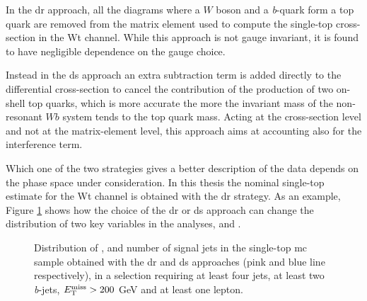 In the \gls{dr} approach, all the diagrams where a $W$ boson and a \textit{b}-quark form a top quark are removed from the matrix element used to compute the   single-top cross-section in the Wt channel. While this approach is not gauge invariant, it is found to have negligible dependence on the gauge choice.

Instead in the \gls{ds} approach an extra subtraction term is added directly to the differential cross-section to cancel the contribution of the 
production of two on-shell top quarks, which is more accurate the more the invariant mass of the non-resonant $Wb$ system tends to the top quark mass. 
Acting at the cross-section level and not at the matrix-element level, this approach aims at accounting also for the interference term. 

Which one of the two strategies gives a better description of the data depends on the phase space under consideration. 
In this thesis the nominal single-top estimate for the Wt channel is obtained with the \gls{dr} strategy. 
As an example, Figure \ref{fig:st_1L} shows how the choice of the \gls{dr} or \gls{ds} approach can change the distribution of two key variables 
in the analyses, \met and \mtb. 

\begin{figure}[h!]
\centering 
{}
\caption{Distribution of  \met,   \mtb and  number of signal jets in the single-top \gls{mc} sample obtained with the \gls{dr} and \gls{ds} approaches (pink and blue line respectively), in a selection requiring at least four jets, at least two \textit{b}-jets, $E_{\rm T}^{\mathrm{miss}}>200$ GeV and at least one lepton. 
}\label{fig:st_1L}
\end{figure}

